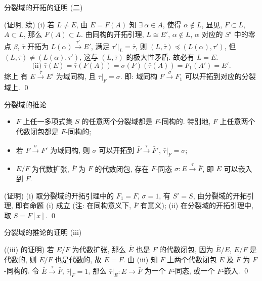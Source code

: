 
\begin{frame}{分裂域的开拓的证明 (二)}

\startproof[bg=yellow, fg=red](证明, 续)
(i) 若 $L \neq E$, 由 $E = F(A)$ 知 $\exists\ \alpha \in A$, 使得 $\alpha \notin L$,
显见, $F \subset L$, $A \subset L$, 那么 $F(A) \subset L$.
由同构的开拓引理, $L \cong E'$, $\alpha \notin L$,
$\alpha$ 对应的 $S'$ 中的零点 $\beta$, $\bar{\tau}$ 开拓为
$L(\alpha) \xrightarrow{\ \tau'\ } E'$, 满足 $\tau'|_L = \bar{\tau}$,
则 $(L, \bar{\tau}) \preccurlyeq (L(\alpha), \tau')$,
但 $(L, \bar{\tau}) \neq (L(\alpha), \tau')$,
这与 $(L, \bar{\tau})$ 的极大性矛盾. 故必有 $L = E$.
\[
\text{(ii) } \bar{\tau}(E) = \bar{\tau}(F(A)) = \sigma(F)(\bar{\tau}(A)) = F_1(A') = E'.
\]
综上 有 $E \xrightarrow{\ \bar{\tau}\ } E'$ 为域同构, 且 $\bar{\tau}|_F = \sigma$.
即: 域同构 $F \xrightarrow{\ \sigma\ } F_1$ 可以开拓到对应的分裂域上.
\qed

\end{frame}


\begin{frame}{分裂域的推论}

\begin{cor}[分裂域的推论]
\begin{itemize}
\item[(i)] $F$ 上任一多项式集 $S$ 的任意两个分裂域都是 $F$-同构的.
  特别地, $F$ 上任意两个代数闭包都是 $F$-同构的;
\item[(ii)] 若 $F \xrightarrow{\ \sigma\ } F'$ 为域同构, 则 $\sigma$ 可以开拓到
  $\bar{F} \xrightarrow{\ \bar{\tau}\ } \bar{F}'$, $\bar{\tau}|_F = \sigma$;
\item[(iii)] $E/F$ 为代数扩张, $\bar{F}$ 为 $F$ 的代数闭包, 存在 $F$-同态
  $\sigma: E \xrightarrow{\ \tau\ } \bar{F}$, 即 $E$ 可以嵌入到 $\bar{F}$.
\end{itemize}
\end{cor}

\startproof[bg=yellow, fg=red](证明)
(i) 取分裂域的开拓引理中的 $F_1 = F$, $\sigma = 1$, 有 $S' = S$,
由分裂域的开拓引理, 即有命题 (i) 成立
(注: 在同构意义下, $\bar{F}$ 有意义);
(ii) 在分裂域的开拓引理中, 取 $S = F[x]$.
\qed

\end{frame}


\begin{frame}{分裂域的推论的证明 (iii)}

\startproof[bg=yellow, fg=red]((iii) 的证明)
若 $E/F$ 为代数扩张, 那么 $\bar{E}$ 也是 $F$ 的代数闭包,
因为 $\bar{E}/E$, $E/F$ 是代数的, 则 $\bar{E}/F$ 也是代数的, 故 $\bar{E} = \bar{F}$.
由 (iii) 知 $F$ 上两个代数闭包 $\bar{E}$ 及 $\bar{F}$ 为 $F$-同构的.
令 $\bar{E} \xrightarrow{\ \bar{\tau}\ } \bar{F}$, $\bar{\tau}|_F = 1$,
那么 $\bar{\tau}|_E: E \to \bar{F}$ 为一个 $F$-同态, 或一个 $F$-嵌入.
\qed

\end{frame}

